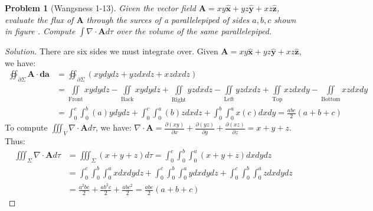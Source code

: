 \documentclass[oneside]{book}
\theoremstyle{mystyle}
\newtheorem{problem}{Problem}[section]
\begin{document}
\begin{problem}[Wangsness 1-13]
\label{problem:EMAG_1_wangsness_1_13}
Given the vector field $\mathbf{A} = xy\hat{\mathbf{x}}+yz\hat{\mathbf{y}}+xz\hat{\mathbf{z}}$, evaluate the flux of $\mathbf{A}$ through the surces of a parallelepiped of sides $a,b,c$ shown in figure . Compute $\int \nabla \cdot \mathbf{A}d\tau$ over the volume of the same parallelepiped.
\end{problem}
\begin{proof}[Solution]
There are six sides we must integrate over. Given $\mathbf{A} = xy\hat{\mathbf{x}}+yz\hat{\mathbf{y}}+xz\hat{\mathbf{z}}$, we have:
\begin{align*}
    \oiint_{\partial \Sigma}\mathbf{A}\cdot \boldsymbol{da} &= \oiint_{\partial \Sigma} (xydydz + yzdxdz+xzdxdz)\\
    &=\underset{\textrm{Front}}{\iint}xydydz-\underset{\textrm{Back}}{\iint}xydydz+\underset{\textrm{Right}}{\iint}yzdxdz-\underset{\textrm{Left}}{\iint}yzdxdz+\underset{\textrm{Top}}{\iint}xzdxdy-\underset{\textrm{Bottom}}{\iint}xzdxdy\\
    &=\int_{0}^{c}\int_{0}^{b}(a)ydydz+\int_{0}^{c}\int_{0}^{a}(b)zdxdz+\int_{0}^{b}\int_{0}^{a}x(c)dxdy=\frac{abc}{2}(a+b+c)
\end{align*}
To compute $\iiint_{V}\nabla\cdot\mathbf{A}d\tau$, we have: $\nabla\cdot\mathbf{A}=\frac{\partial(xy)}{\partial x}+\frac{\partial(yz)}{\partial y}+\frac{\partial(xz)}{\partial z}=x+y+z$. Thus:
\begin{align*}
    \iiint_{\Sigma}\nabla\cdot\mathbf{A}d\tau &=\iiint_{\Sigma}(x+y+z)d\tau=\int_{0}^{c}\int_{0}^{b}\int_{0}^{a}(x+y+z)dxdydz\\
    &=\int_{0}^{c}\int_{0}^{b}\int_{0}^{a}xdxdydz+\int_{0}^{c}\int_{0}^{b}\int_{0}^{a}ydxdydz+\int_{0}^{c}\int_{0}^{b}\int_{0}^{a}zdxdydz\\
    &=\frac{a^{2}bc}{2}+\frac{ab^{2}c}{2}+\frac{abc^{2}}{2}=\frac{abc}{2}(a+b+c)
\end{align*}
\end{proof}
\end{document}
